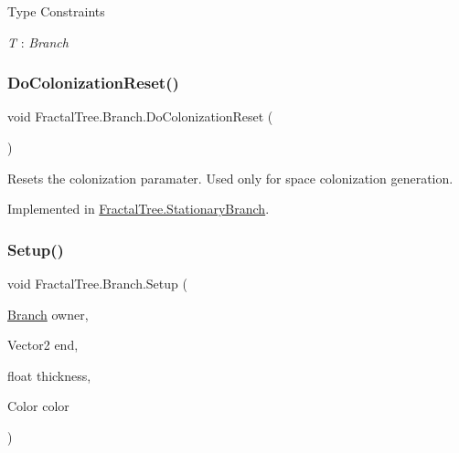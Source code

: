 \begin{Desc}
\item[Type Constraints]\begin{description}
\item[{\em T} : {\em Branch}]\end{description}
\end{Desc}
\mbox{\label{interface_fractal_tree_1_1_branch_a4460379e72ec587f890b1e0cf77dbc3c}} 
\subsubsection{\texorpdfstring{Do\+Colonization\+Reset()}{DoColonizationReset()}}
{\footnotesize\ttfamily void Fractal\+Tree.\+Branch.\+Do\+Colonization\+Reset (\begin{DoxyParamCaption}{ }\end{DoxyParamCaption})}



Resets the colonization paramater. Used only for space colonization generation. 



Implemented in \hyperlink{class_fractal_tree_1_1_stationary_branch_a57a5b1cbc9fd081c5b8cb41b61d24502}{Fractal\+Tree.\+Stationary\+Branch}.

\mbox{\label{interface_fractal_tree_1_1_branch_a1bad78362d67435aed4538b207f4155b}} 
\subsubsection{\texorpdfstring{Setup()}{Setup()}\hspace{0.1cm}{\footnotesize\ttfamily [1/4]}}
{\footnotesize\ttfamily void Fractal\+Tree.\+Branch.\+Setup (\begin{DoxyParamCaption}\item[{\hyperlink{interface_fractal_tree_1_1_branch}{Branch}}]{owner,  }\item[{Vector2}]{end,  }\item[{float}]{thickness,  }\item[{Color}]{color }\end{DoxyParamCaption})}



